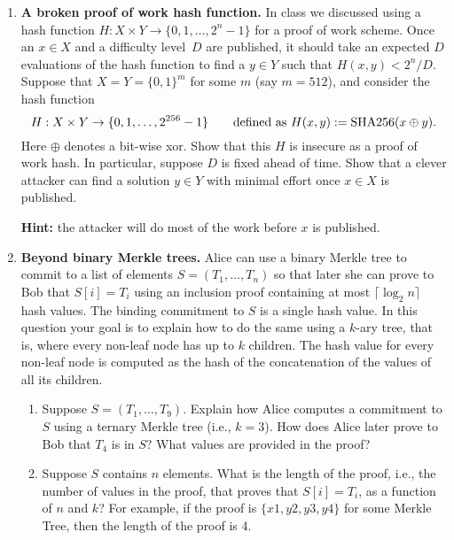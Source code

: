 \documentclass[11pt]{article}
\newcommand{\xor}{\oplus}
\newcommand{\deq}{\mathrel{:=}}
\newenvironment{problems}
{\begin{enumerate}[label=\bfseries Problem \arabic*.,align=left,leftmargin=1em,labelwidth=1.5em]}
{\end{enumerate}}
\newenvironment{subparts}
{\begin{enumerate}[label=\bfseries \alph*.,align=right,leftmargin=1.5em]}
{\end{enumerate}}
\begin{document}
\begin{problems}



\item 
{\bf A broken proof of work hash function.}
In class we discussed using a hash function 
$H:X \times Y \to \{0,1,\ldots,2^n-1\}$
for a proof of work scheme.
Once an $x \in X$ and a difficulty level~$D$ are published,
it should take an expected $D$ evaluations 
of the hash function to find a $y \in Y$ such that $H(x,y)<2^n/D$. 
Suppose that $X = Y = \{0,1\}^m$ for some $m$ (say $m=512$),
and consider the hash function 
\[    H:X \times Y \to \{0,1,\ldots,2^{256}-1\}  \qquad 
         \text{defined as $ H(x,y) \deq \text{SHA256}(x \xor y)$}.  
\]
Here $\xor$ denotes a bit-wise xor.
Show that this $H$ is insecure as a proof of work hash.
In particular, suppose $D$ is fixed ahead of time.
Show that a clever attacker can find a solution $y \in Y$ 
with minimal effort once $x \in X$ is published. 

{\bf Hint:} the attacker will do most of the work before $x$ is published.




\item {\bf Beyond binary Merkle trees.}  Alice can use a binary Merkle
  tree to commit to a list of elements $S = (T_1, \ldots, T_n)$ so
  that later she can prove to Bob that $S[i] = T_i$ using an
  inclusion proof containing at most $\lceil \log_2 n \rceil$ hash
  values.  The binding commitment to $S$ is a single hash value. In
  this question your goal is to explain how to do the same using a
  $k$-ary tree, that is, where every non-leaf node has up to $k$
  children. The hash value for every non-leaf node is computed as the
  hash of the concatenation of the values of all its children.
\begin{subparts}
\item 
Suppose $S = (T_1, \ldots, T_9)$. Explain how Alice computes a
commitment to $S$ using a ternary Merkle tree (i.e., $k=3$).  
How does Alice later prove to Bob that $T_4$ is in $S$?
What values are provided in the proof?

\item
Suppose $S$ contains $n$ elements. What is the length of the proof, i.e., the number of values in the proof,
that proves that $S[i] = T_i$, as a function of $n$ and $k$? For example, if the proof is $\{x1, y2, y3, y4\}$ for some Merkle Tree, then the length of the proof is 4. 


\end{subparts}
\end{problems}
\end{document}
